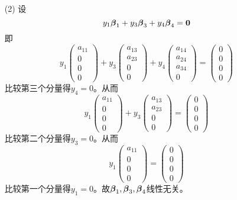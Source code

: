 \begin{frame}[allowframebreaks]
\begin{itemize}
\item[(2)] 设
  $$
  y_1\boldsymbol{\beta}_1 + y_3\boldsymbol{\beta}_3 + y_4\boldsymbol{\beta}_4=\boldsymbol{0}
  $$
  即
  $$
  y_1\left(
    \begin{array}{c}
      a_{11}\\
      0\\
      0\\
      0
    \end{array}
  \right) + y_3\left(
    \begin{array}{c}
      a_{13}\\
      a_{23}\\
      0\\
      0
    \end{array}
  \right) + y_4\left(
    \begin{array}{c}
      a_{14}\\
      a_{24}\\
      a_{34}\\
      0
    \end{array}
  \right) = \left(
    \begin{array}{c}
      0\\
      0\\
      0\\
      0
    \end{array}
  \right)
  $$
  比较第三个分量得$y_4=0$。从而
  $$
  y_1\left(
    \begin{array}{c}
      a_{11}\\
      0\\
      0\\
      0
    \end{array}
  \right) + y_3\left(
    \begin{array}{c}
      a_{13}\\
      a_{23}\\
      0\\
      0
    \end{array}
  \right) = \left(
    \begin{array}{c}
      0\\
      0\\
      0\\
      0
    \end{array}
  \right)
  $$比较第二个分量得$y_3=0$。从而
  $$
  y_1\left(
    \begin{array}{c}
      a_{11}\\
      0\\
      0\\
      0
    \end{array}
  \right) = \left(
    \begin{array}{c}
      0\\
      0\\
      0\\
      0
    \end{array}
  \right)
  $$ 比较第一个分量得$y_1=0$。故$\boldsymbol{\beta}_1,\boldsymbol{\beta}_3,\boldsymbol{\beta}_4$线性无关。
\end{itemize}
\end{frame}


